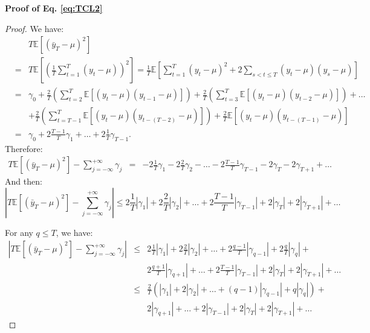 \documentclass[
  12pt,
]{book}
\theoremstyle{definition}
\theoremstyle{definition}
\theoremstyle{definition}
\theoremstyle{definition}
\theoremstyle{remark}
\begin{document}
\textbf{Proof of Eq. \eqref{eq:TCL2}}

\begin{proof}
We have:
\begin{eqnarray*}
&&T\mathbb{E}\left[(\bar{y}_T - \mu)^2\right]\\
&=& T\mathbb{E}\left[\left(\frac{1}{T}\sum_{t=1}^T(y_t - \mu)\right)^2\right] = \frac{1}{T} \mathbb{E}\left[\sum_{t=1}^T(y_t - \mu)^2+2\sum_{s<t\le T}(y_t - \mu)(y_s - \mu)\right]\\
&=& \gamma_0 +\frac{2}{T}\left(\sum_{t=2}^{T}\mathbb{E}\left[(y_t - \mu)(y_{t-1} - \mu)\right]\right) +\frac{2}{T}\left(\sum_{t=3}^{T}\mathbb{E}\left[(y_t - \mu)(y_{t-2} - \mu)\right]\right) + \dots \\
&&+ \frac{2}{T}\left(\sum_{t=T-1}^{T}\mathbb{E}\left[(y_t - \mu)(y_{t-(T-2)} - \mu)\right]\right) + \frac{2}{T}\mathbb{E}\left[(y_t - \mu)(y_{t-(T-1)} - \mu)\right]\\
&=&  \gamma_0 + 2 \frac{T-1}{T}\gamma_1 + \dots + 2 \frac{1}{T}\gamma_{T-1} .
\end{eqnarray*}
Therefore:
\begin{eqnarray*}
T\mathbb{E}\left[(\bar{y}_T - \mu)^2\right] - \sum_{j=-\infty}^{+\infty} \gamma_j &=& - 2\frac{1}{T}\gamma_1 - 2\frac{2}{T}\gamma_2 - \dots - 2\frac{T-1}{T}\gamma_{T-1} - 2\gamma_T - 2 \gamma_{T+1} + \dots
\end{eqnarray*}
And then:
\[
\left|T\mathbb{E}\left[(\bar{y}_T - \mu)^2\right] - \sum_{j=-\infty}^{+\infty} \gamma_j\right| \le 2\frac{1}{T}|\gamma_1| + 2\frac{2}{T}|\gamma_2| + \dots + 2\frac{T-1}{T}|\gamma_{T-1}| + 2|\gamma_T| + 2 |\gamma_{T+1}| + \dots
\]

For any \(q \le T\), we have:
\begin{eqnarray*}
\left|T\mathbb{E}\left[(\bar{y}_T - \mu)^2\right] - \sum_{j=-\infty}^{+\infty} \gamma_j\right| &\le& 2\frac{1}{T}|\gamma_1| + 2\frac{2}{T}|\gamma_2| + \dots + 2\frac{q-1}{T}|\gamma_{q-1}| +2\frac{q}{T}|\gamma_q| +\\
&&2\frac{q+1}{T}|\gamma_{q+1}| + \dots  + 2\frac{T-1}{T}|\gamma_{T-1}| + 2|\gamma_T| + 2 |\gamma_{T+1}| + \dots\\
&\le& \frac{2}{T}\left(|\gamma_1| + 2|\gamma_2| + \dots + (q-1)|\gamma_{q-1}| +q|\gamma_q|\right) +\\
&&2|\gamma_{q+1}| + \dots  + 2|\gamma_{T-1}| + 2|\gamma_T| + 2 |\gamma_{T+1}| + \dots
\end{eqnarray*}


\end{proof}
\end{document}
